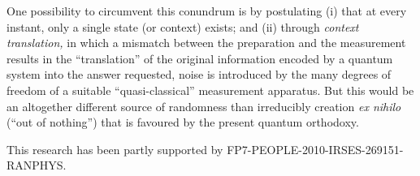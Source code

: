 \documentclass[%
 preprint,
 showpacs,
 showkeys,
 preprintnumbers,
 amsmath,amssymb,
 aps,
  pra,
  longbibliography,
 ]{revtex4-1}
\begin{document}
One possibility to circumvent this conundrum is by postulating
(i) that at every instant, only a single state (or context) exists;
and
(ii) through {\em context translation,}
in which a mismatch between the preparation and the measurement results in the ``translation''
of the original information encoded by a quantum system into the answer requested,
noise is introduced by the many degrees of freedom of a suitable ``quasi-classical'' measurement apparatus.
But this would be an altogether different source of randomness than irreducibly creation {\it ex nihilo} (``out of nothing'')
that is favoured by the present quantum orthodoxy.

\begin{acknowledgements}
 This research has been partly supported by FP7-PEOPLE-2010-IRSES-269151-RANPHYS.
\end{acknowledgements}


\end{document}
